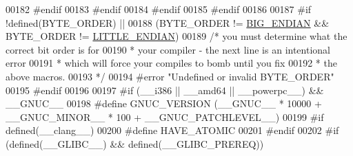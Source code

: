 \begin{DoxyCode}
00182 \textcolor{preprocessor}{#}\textcolor{preprocessor}{endif}
00183 \textcolor{preprocessor}{#}\textcolor{preprocessor}{endif}
00184 \textcolor{preprocessor}{#}\textcolor{preprocessor}{endif}
00185 \textcolor{preprocessor}{#}\textcolor{preprocessor}{endif}
00186 
00187 \textcolor{preprocessor}{#}\textcolor{preprocessor}{if} \textcolor{preprocessor}{!}\textcolor{preprocessor}{defined}\textcolor{preprocessor}{(}BYTE\_ORDER\textcolor{preprocessor}{)} \textcolor{preprocessor}{||}
00188     \textcolor{preprocessor}{(}BYTE\_ORDER \textcolor{preprocessor}{!=} \hyperlink{config_8h_a23eb5e058a210efdde3d64e69679fafa}{BIG\_ENDIAN} \textcolor{preprocessor}{&&} BYTE\_ORDER \textcolor{preprocessor}{!=} \hyperlink{config_8h_a8782a401fbf55261460863fc2f8df1ce}{LITTLE\_ENDIAN}\textcolor{preprocessor}{)}
00189     \textcolor{comment}{/* you must determine what the correct bit order is for}
00190 \textcolor{comment}{     * your compiler - the next line is an intentional error}
00191 \textcolor{comment}{     * which will force your compiles to bomb until you fix}
00192 \textcolor{comment}{     * the above macros.}
00193 \textcolor{comment}{     */}
00194 \textcolor{preprocessor}{#}\textcolor{preprocessor}{error} \textcolor{stringliteral}{"Undefined or invalid BYTE\_ORDER"}
00195 \textcolor{preprocessor}{#}\textcolor{preprocessor}{endif}
00196 
00197 \textcolor{preprocessor}{#}\textcolor{preprocessor}{if} \textcolor{preprocessor}{(}\textcolor{preprocessor}{\_\_i386} \textcolor{preprocessor}{||} \_\_amd64 \textcolor{preprocessor}{||} \textcolor{preprocessor}{\_\_powerpc\_\_}\textcolor{preprocessor}{)} \textcolor{preprocessor}{&&} \_\_GNUC\_\_
00198 \textcolor{preprocessor}{#}\textcolor{preprocessor}{define} \textcolor{preprocessor}{GNUC\_VERSION} \textcolor{preprocessor}{(}\_\_GNUC\_\_ \textcolor{preprocessor}{*} 10000 \textcolor{preprocessor}{+} \_\_GNUC\_MINOR\_\_ \textcolor{preprocessor}{*} 100 \textcolor{preprocessor}{+} \_\_GNUC\_PATCHLEVEL\_\_\textcolor{preprocessor}{)}
00199 \textcolor{preprocessor}{#}\textcolor{preprocessor}{if} \textcolor{preprocessor}{defined}\textcolor{preprocessor}{(}\_\_clang\_\_\textcolor{preprocessor}{)}
00200 \textcolor{preprocessor}{#}\textcolor{preprocessor}{define} \textcolor{preprocessor}{HAVE\_ATOMIC}
00201 \textcolor{preprocessor}{#}\textcolor{preprocessor}{endif}
00202 \textcolor{preprocessor}{#}\textcolor{preprocessor}{if} \textcolor{preprocessor}{(}\textcolor{preprocessor}{defined}\textcolor{preprocessor}{(}\_\_GLIBC\_\_\textcolor{preprocessor}{)} \textcolor{preprocessor}{&&} \textcolor{preprocessor}{defined}\textcolor{preprocessor}{(}\_\_GLIBC\_PREREQ\textcolor{preprocessor}{)}\textcolor{preprocessor}{)}

\end{DoxyCode}
